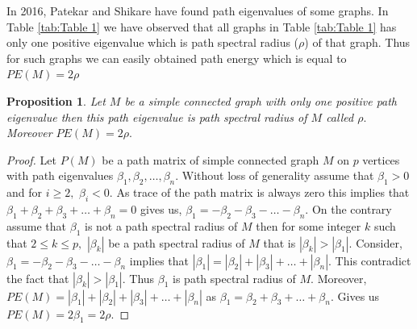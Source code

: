 \documentclass{article}
\newtheorem{proposition}[theorem]{Proposition}
\newtheorem*{open problem*}{Open Problem}
\begin{document}
	In 2016, Patekar and Shikare \cite{pe1} have found path eigenvalues of some graphs. In Table \ref{tab:Table 1} we have observed that all graphs in Table \ref{tab:Table 1} has only one positive eigenvalue which is path spectral radius ($\rho$) of that graph. Thus for such graphs we can easily obtained path energy which is equal to $PE(M)=2\rho$
	\begin{proposition}
		Let $M$ be a simple connected graph with only one positive path eigenvalue then this path eigenvalue is path spectral radius of $M$ called $\rho.$ Moreover $PE(M)=2\rho.$  
	\end{proposition}     
	\begin{proof}
		Let $P(M)$ be a path matrix of simple connected graph $M$ on $p$ vertices with path eigenvalues $\beta_1,\beta_2, \ldots, \beta_n.$ Without loss of generality assume that $\beta_1 > 0$ and for $i\geq2,$ $\beta_i < 0.$ As trace of the path matrix is always zero this implies that $\beta_1+ \beta_2+\beta_3 +\ldots+\beta_n=0$ gives us, $\beta_1= -\beta_2-\beta_3 -\ldots-\beta_n.$ On the contrary assume that $\beta_1$ is not a path spectral radius of $M$ then for some integer $k$ such that $2 \leq k\leq p,$ $|\beta_k|$ be a path spectral radius of $M$ that is $|\beta_k|>|\beta_1|$. Consider, $\beta_1= -\beta_2-\beta_3 -\ldots-\beta_n$ implies that $|\beta_1|= |\beta_2|+|\beta_3| +\ldots+|\beta_n|.$ This contradict the fact that $|\beta_k|>|\beta_1|$. Thus $\beta_1$ is path spectral radius of $M.$ Moreover, $PE(M)=|\beta_1|+ |\beta_2|+|\beta_3| +\ldots+|\beta_n|$ as $\beta_1= \beta_2+\beta_3 +\ldots+\beta_n.$ Gives us $PE(M)=2\beta_1=2\rho.$      
	\end{proof}
\end{document}
